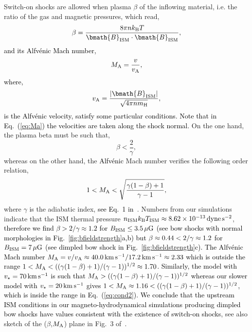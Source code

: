 \documentclass[useAMS,usenatbib]{mn2e}
\begin{document}
Switch-on shocks are allowed when plasma $\beta$ of the inflowing material,
i.e. the ratio of the gas and magnetic pressures, which read,
%
\begin{equation}
	\beta = \frac{8\pi n k_{\rm B} T }{\bmath{B}_{\rm ISM} \cdot \bmath{B}_{\rm ISM} },
\label{eq:beta}
\end{equation}
%
\textcolor{black}{and its \textcolor{black}{Alfv\' enic} Mach number,
%
\begin{equation}
	M_{\rm A} = \frac{ v  }{ v_{\rm A} },
\label{eq:Ma}
\end{equation}
%
where,
%
\begin{equation}
	v_{\rm A} = \frac{ |\bmath{B}_{\rm ISM}|  }{ \sqrt{ 4 \pi n m_{\rm H} } },
\label{eq:va}
\end{equation}
%
is the Alfv\' enic velocity, satisfy some particular conditions. 
Note that in Eq.~(\ref{eq:Ma}) the velocities are taken along the shock normal. }
On the one hand, the plasma beta must be such that,
%
\begin{equation}
	\beta < \frac{2}{\gamma},
\label{eq:cond1}
\end{equation}
%
whereas on the other hand, the \textcolor{black}{Alfv\' enic} Mach number verifies the following order 
relation,
%
\begin{equation}
	1 < M_{\rm A} < \sqrt{ \frac{\gamma(1-\beta)+1 }{\gamma-1} },
\label{eq:cond2}
\end{equation}
%
where $\gamma$ is the adiabatic index, \textcolor{black}{see Eq.~1 in~\citet{pogolerov_aa_354_2000}}. Numbers from our simulations indicate
that the ISM thermal pressure $n_{\rm ISM} k_{\rm B} T_{\rm ISM}\approx 8.62
\times 10^{-13}\, \rm dyne\, \rm s^{-2}$, \textcolor{black}{therefore we find 
$\beta > 2/\gamma \approx 1.2$ for $B_{\rm ISM} \le 3.5\, \mu \rm G$ 
(see bow shocks with normal morphologies in Fig.~\ref{fig:bfieldstrength}a,b)
but $\beta \approx
\textcolor{black}{0.44}< 2/\gamma \approx 1.2$ for $B_{\rm ISM}=7\, \mu \rm G$ 
(see dimpled bow shock in Fig.~\ref{fig:bfieldstrength}c).
The \textcolor{black}{Alfv\' enic} Mach number $M_{\rm A} =
v/v_{\rm A} \approx 40.0\, \rm  km\, \rm s^{-1}/17.2\, \rm  km\, \rm
s^{-1} \approx 2.33$ which is outside the range 
$1<M_{\rm A}<((\gamma(1-\beta)+1)/(\gamma-1))^{1/2} \approx \textcolor{black}{1.70}$. 
Similarly, the model with $v_{\star}=70\, \rm  km\, \rm s^{-1}$ is such that 
$M_{\rm A}>((\gamma(1-\beta)+1)/(\gamma-1))^{1/2}$ whereas our slower model with 
$v_{\star}=20\, \rm  km\, \rm s^{-1}$ gives 
$1<M_{\rm A}\approx 1.16<((\gamma(1-\beta)+1)/(\gamma-1))^{1/2}$, which 
is inside the range in Eq.~(\ref{eq:cond2}).  
We conclude that the upstream ISM conditions in our magneto-hydrodynamical 
simulations producing dimpled bow shocks have values consistent with the 
existence of switch-on shocks}, see also sketch of the ($\beta$,$M_{\rm A}$) 
plane in Fig.~3 of~\citet{sterck_aa_343_1999}.
\end{document}
